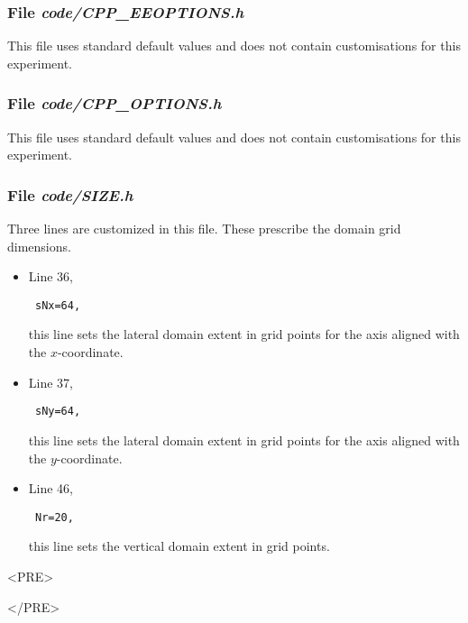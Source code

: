 \subsubsection{File {\it code/CPP\_EEOPTIONS.h}}

This file uses standard default values and does not contain
customisations for this experiment.

\subsubsection{File {\it code/CPP\_OPTIONS.h}}

This file uses standard default values and does not contain
customisations for this experiment.

\subsubsection{File {\it code/SIZE.h}}

Three lines are customized in this file. These prescribe the domain grid dimensions.
\begin{itemize}

\item Line 36, 
\begin{verbatim} sNx=64, \end{verbatim} this line sets
the lateral domain extent in grid points for the
axis aligned with the $x$-coordinate.

\item Line 37, 
\begin{verbatim} sNy=64, \end{verbatim} this line sets
the lateral domain extent in grid points for the
axis aligned with the $y$-coordinate.

\item Line 46, 
\begin{verbatim} Nr=20,   \end{verbatim} this line sets
the vertical domain extent in grid points.

\end{itemize}

\begin{rawhtml}<PRE>\end{rawhtml}
\begin{small}

\end{small}
\begin{rawhtml}</PRE>\end{rawhtml}

